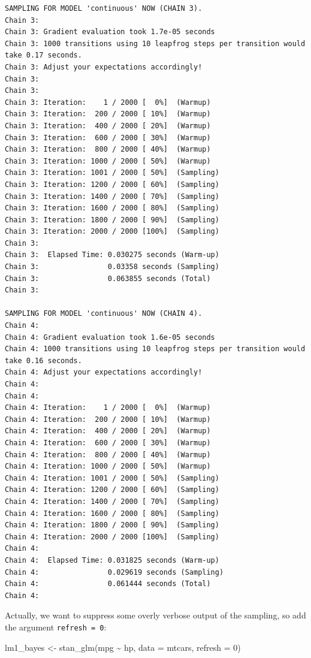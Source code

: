 \documentclass[
  letterpaper,
  DIV=11,
  numbers=noendperiod]{scrreprt}
\newenvironment{Shaded}{\begin{snugshade}}{\end{snugshade}}
\newcommand{\AttributeTok}[1]{\textcolor[rgb]{0.40,0.45,0.13}{#1}}
\newcommand{\DecValTok}[1]{\textcolor[rgb]{0.68,0.00,0.00}{#1}}
\newcommand{\FunctionTok}[1]{\textcolor[rgb]{0.28,0.35,0.67}{#1}}
\newcommand{\NormalTok}[1]{\textcolor[rgb]{0.00,0.23,0.31}{#1}}
\newcommand{\OtherTok}[1]{\textcolor[rgb]{0.00,0.23,0.31}{#1}}
\newcommand{\SpecialCharTok}[1]{\textcolor[rgb]{0.37,0.37,0.37}{#1}}
\theoremstyle{definition}
\theoremstyle{definition}
\theoremstyle{remark}
\begin{document}
\begin{verbatim}
SAMPLING FOR MODEL 'continuous' NOW (CHAIN 3).
Chain 3: 
Chain 3: Gradient evaluation took 1.7e-05 seconds
Chain 3: 1000 transitions using 10 leapfrog steps per transition would take 0.17 seconds.
Chain 3: Adjust your expectations accordingly!
Chain 3: 
Chain 3: 
Chain 3: Iteration:    1 / 2000 [  0%]  (Warmup)
Chain 3: Iteration:  200 / 2000 [ 10%]  (Warmup)
Chain 3: Iteration:  400 / 2000 [ 20%]  (Warmup)
Chain 3: Iteration:  600 / 2000 [ 30%]  (Warmup)
Chain 3: Iteration:  800 / 2000 [ 40%]  (Warmup)
Chain 3: Iteration: 1000 / 2000 [ 50%]  (Warmup)
Chain 3: Iteration: 1001 / 2000 [ 50%]  (Sampling)
Chain 3: Iteration: 1200 / 2000 [ 60%]  (Sampling)
Chain 3: Iteration: 1400 / 2000 [ 70%]  (Sampling)
Chain 3: Iteration: 1600 / 2000 [ 80%]  (Sampling)
Chain 3: Iteration: 1800 / 2000 [ 90%]  (Sampling)
Chain 3: Iteration: 2000 / 2000 [100%]  (Sampling)
Chain 3: 
Chain 3:  Elapsed Time: 0.030275 seconds (Warm-up)
Chain 3:                0.03358 seconds (Sampling)
Chain 3:                0.063855 seconds (Total)
Chain 3: 

SAMPLING FOR MODEL 'continuous' NOW (CHAIN 4).
Chain 4: 
Chain 4: Gradient evaluation took 1.6e-05 seconds
Chain 4: 1000 transitions using 10 leapfrog steps per transition would take 0.16 seconds.
Chain 4: Adjust your expectations accordingly!
Chain 4: 
Chain 4: 
Chain 4: Iteration:    1 / 2000 [  0%]  (Warmup)
Chain 4: Iteration:  200 / 2000 [ 10%]  (Warmup)
Chain 4: Iteration:  400 / 2000 [ 20%]  (Warmup)
Chain 4: Iteration:  600 / 2000 [ 30%]  (Warmup)
Chain 4: Iteration:  800 / 2000 [ 40%]  (Warmup)
Chain 4: Iteration: 1000 / 2000 [ 50%]  (Warmup)
Chain 4: Iteration: 1001 / 2000 [ 50%]  (Sampling)
Chain 4: Iteration: 1200 / 2000 [ 60%]  (Sampling)
Chain 4: Iteration: 1400 / 2000 [ 70%]  (Sampling)
Chain 4: Iteration: 1600 / 2000 [ 80%]  (Sampling)
Chain 4: Iteration: 1800 / 2000 [ 90%]  (Sampling)
Chain 4: Iteration: 2000 / 2000 [100%]  (Sampling)
Chain 4: 
Chain 4:  Elapsed Time: 0.031825 seconds (Warm-up)
Chain 4:                0.029619 seconds (Sampling)
Chain 4:                0.061444 seconds (Total)
Chain 4: 
\end{verbatim}

Actually, we want to suppress some overly verbose output of the
sampling, so add the argument \texttt{refresh\ =\ 0}:

\begin{Shaded}
\begin{Highlighting}[]
\NormalTok{lm1\_bayes }\OtherTok{\textless{}{-}} \FunctionTok{stan\_glm}\NormalTok{(mpg }\SpecialCharTok{\textasciitilde{}}\NormalTok{ hp, }\AttributeTok{data =}\NormalTok{ mtcars, }\AttributeTok{refresh =} \DecValTok{0}\NormalTok{)}
\end{Highlighting}
\end{Shaded}
\end{document}
